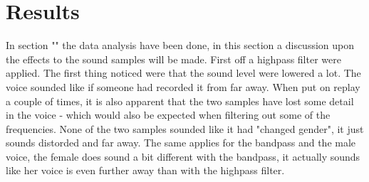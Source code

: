 
\section{Results}
In section "" the data analysis have been done, in this section a discussion upon the effects to the sound samples will be made. First off a highpass filter were applied. The first thing noticed were that the sound level were lowered a lot. The voice sounded like if someone had recorded it from far away. When put on replay a couple of times, it is also apparent that the two samples have lost some detail in the voice - which would also be expected when filtering out some of the frequencies. None of the two samples sounded like it had "changed gender", it just sounds distorded and far away. The same applies for the bandpass and the male voice, the female does sound a bit different with the bandpass, it actually sounds like her voice is even further away than with the highpass filter. 